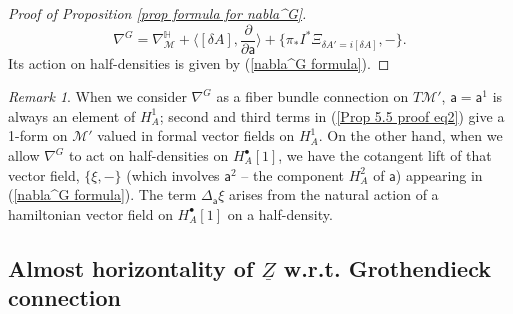 \documentclass[11pt,a4paper]{amsart}
\theoremstyle{plain} %
\theoremstyle{definition}
\theoremstyle{remark}
\newtheorem{rem}[thm]{Remark}
\newcommand{\sfa}{\mathsf{a}}
\newcommand{\bt}{\bullet}
\newcommand{\M}{\mathcal{M}}
\newcommand{\ul}{\underline}
\begin{document}
{\begin{proof}[Proof of Proposition \ref{prop formula for nabla^G}]
\begin{equation}
    \nabla^G= \nabla^\mathbb{H}_{\M}+\langle [\delta A],\frac{\partial}{\partial \sfa} \rangle+\{\pi_* I^* \Xi_{\delta A'=i[\delta A]},-\}.
    \end{equation}
    Its action on half-densities is given by (\ref{nabla^G formula}).
\end{proof}
\begin{rem}
    When we consider $\nabla^G$ as a fiber bundle connection on $T\M'$, $\sfa=\sfa^1$ is always an element of $H^1_A$; second and third terms in (\ref{Prop 5.5 proof eq2}) give a 1-form on $\M'$ valued in formal vector fields on $H^1_A$. On the other hand, when we allow $\nabla^G$ to act on half-densities on $H^\bt_A[1]$, we have the cotangent lift of that vector field, 
    $\{\xi,-\}$ (which involves $\sfa^2$ -- the component $H^2_A$ of $\sfa$) appearing in (\ref{nabla^G formula}). The term $\Delta_\sfa\xi$ arises from the natural action of a hamiltonian vector field on $H^\bt_{A}[1]$ on a half-density.
\end{rem}
}



\subsection{Almost horizontality of $\ul{Z}$ w.r.t. Grothendieck connection}
\end{document}
